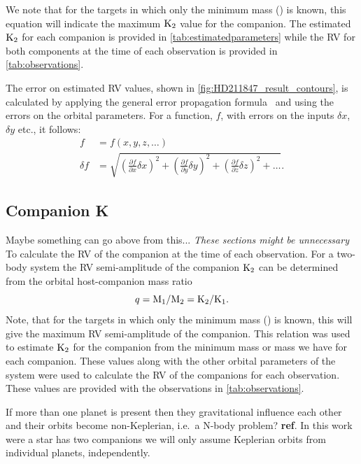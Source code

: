 We note that for the targets in which only the minimum mass (\mtwosini) is known, this equation will indicate the maximum \(\textrm{K}_{2}\) value for the companion. The estimated \(\textrm{K}_{2}\) for each companion is provided in \cref{tab:estimatedparameters} while the {RV} for both components at the time of each observation is provided in \cref{tab:observations}.


The error on estimated {RV} values, shown in \cref{fig:HD211847_result_contours}, is calculated by applying the general error propagation formula~\citep{ku_notes_1966} and using the errors on the orbital parameters. For a function, \(f\), with errors on the inputs \(\delta x\), \(\delta y\) etc., it follows:
\begin{align}
f &= f(x, y, z, \ldots)\\
\delta f &= \sqrt{{\left( \frac{\partial f}{\partial x} \delta x\right)}^2 + {\left(\frac{\partial f}{\partial y} \delta y\right)}^2 + {\left(\frac{\partial f}{\partial z} \delta z\right)}^2 + \ldots}.
\end{align}




\subsection{Companion K}  Maybe something can go above from this...
\label{sec:companion_RV}
\emph{These sections might be unnecessary}\\

To calculate the {RV} of the companion at the time of each observation. For a two-body system the {RV} semi-amplitude of the companion \(\textrm{K}_{2}\) can be determined from the orbital host-companion mass ratio
\begin{equation}
q = \textrm{M}_{1}/\textrm{M}_{2} = \textrm{K}_{2}/\textrm{K}_{1}\label{eqn:q_ratio_K2}.
\end{equation}
Note, that for the targets in which only the minimum mass (\mtwosini) is known, this will give the maximum {RV} semi-amplitude of the companion.
This relation was used to estimate \(\textrm{K}_{2}\) for the companion from the minimum mass or mass we have for each companion. These values along with the other orbital parameters of the system were used to calculate the {RV} of the companions for each observation. These values are provided with the observations in \cref{tab:observations}.




If more than one planet is present then they gravitational influence each other and their orbits become non-Keplerian, i.e.\ a N-body problem? {\textbf{ref}}. In this work were a star has two companions we will only assume Keplerian orbits from individual planets, independently.
